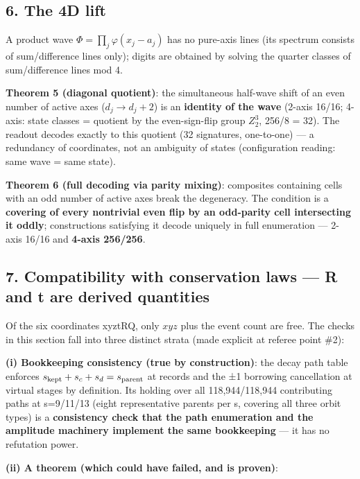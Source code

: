 \documentclass[
]{article}
\begin{document}
\subsection{6. The 4D lift}\label{the-4d-lift}

A product wave \(\Phi=\prod_j\varphi(x_j-a_j)\) has no pure-axis lines
(its spectrum consists of sum/difference lines only); digits are
obtained by solving the quarter classes of sum/difference lines mod 4.

\textbf{Theorem 5 (diagonal quotient)}: the simultaneous half-wave shift
of an even number of active axes (\(d_j\to d_j+2\)) is an
\textbf{identity of the wave} (2-axis 16/16; 4-axis: state classes =
quotient by the even-sign-flip group \(Z_2^3\), 256/8 = 32). The readout
decodes exactly to this quotient (32 signatures, one-to-one) --- a
redundancy of coordinates, not an ambiguity of states (configuration
reading: same wave = same state).

\textbf{Theorem 6 (full decoding via parity mixing)}: composites
containing cells with an odd number of active axes break the degeneracy.
The condition is a \textbf{covering of every nontrivial even flip by an
odd-parity cell intersecting it oddly}; constructions satisfying it
decode uniquely in full enumeration --- 2-axis 16/16 and \textbf{4-axis
256/256}.

\subsection{7. Compatibility with conservation laws --- R and t are
derived
quantities}\label{compatibility-with-conservation-laws-r-and-t-are-derived-quantities}

Of the six coordinates xyztRQ, only \(xyz\) plus the event count are
free. The checks in this section fall into three distinct strata (made
explicit at referee point \#2):

\textbf{(i) Bookkeeping consistency (true by construction)}: the decay
path table enforces \(s_{\rm kept}+s_c+s_d=s_{\rm parent}\) at records
and the ±1 borrowing cancellation at virtual stages by definition. Its
holding over all 118,944/118,944 contributing paths at s=9/11/13 (eight
representative parents per s, covering all three orbit types) is a
\textbf{consistency check that the path enumeration and the amplitude
machinery implement the same bookkeeping} --- it has no refutation
power.

\textbf{(ii) A theorem (which could have failed, and is proven)}:
\end{document}
